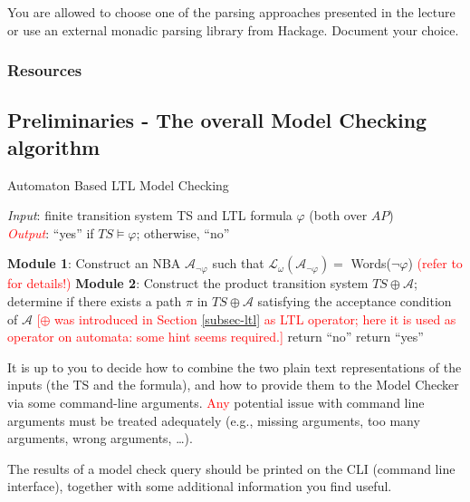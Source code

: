 \documentclass{article}
\begin{document}
You are allowed to choose one of the parsing approaches presented in the lecture or 
use an external monadic parsing library from Hackage. Document your choice.

\subsubsection*{Resources}
\cite[Paragraph 5.1 (in particular 5.1.1 and 5.1.2)]{BaKa}

\subsection{Preliminaries - The overall Model Checking algorithm}
\label{subsec-mca}
\begin{algorithm}[H]
    \caption{Automaton Based LTL Model Checking}
    \label{alg:mc}
    \hspace*{\algorithmicindent} \emph{Input}: finite transition system TS and LTL formula $\varphi$ (both over $AP$) \\
    \hspace*{\algorithmicindent} \textcolor{red}{\emph{Output}}: ``yes'' if $TS \vDash \varphi$; otherwise, ``no''
    \begin{algorithmic}[1]
    \State \textbf{Module 1}: Construct an NBA $\mathcal{A}_{\neg \varphi}$ such that $\mathcal{L}_{\omega}(\mathcal{A}_{\neg \varphi}) = $ Words($\neg \varphi$) \textcolor{red}{(refer to \cite{BaKa} for details!)}
    \State \textbf{Module 2}: Construct the product transition system $TS \oplus \mathcal{A}$; determine if there exists 
                a path $\pi$ in $TS \oplus \mathcal{A}$ satisfying the acceptance condition of $\mathcal{A}$
            \textcolor{red}{[$\oplus$ was introduced in Section \ref{subsec-ltl} as LTL operator; here it is
            used as operator on automata: some hint seems required.]}
        \State return ``no'' 
    \Else 
        \State return ``yes''
    \EndIf
    \end{algorithmic}
\end{algorithm}
  
It is up to you to decide how to combine the two plain text representations of the inputs (the TS and the formula), 
and how to provide them to the Model Checker via some command-line arguments. \textcolor{red}{Any} potential issue with 
command line arguments must be treated adequately (e.g., missing arguments, too many arguments, wrong arguments, \dots).

The results of a model check query should be printed on the CLI (command line interface), together with some additional 
information you find useful.
\end{document}
